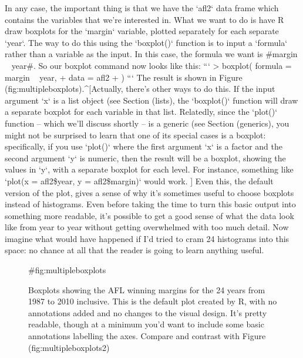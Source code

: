 In any case, the important thing is that we have the `afl2` data frame which contains the variables that we're interested in. What we want to do is have R draw boxplots for the `margin` variable, plotted separately for each separate `year`. The way to do this using the `boxplot()` function is to input a `formula` rather than a variable as the input. In this case, the formula we want is \rtextverb#margin ~ year#. So our boxplot command now looks like this:
```
> boxplot( formula = margin ~ year,
+          data = afl2
+ )
```
The result is shown in Figure \@ref(fig:multipleboxplots).^[Actually, there's other ways to do this. If the input argument `x` is a list object (see Section \@ref(lists), the `boxplot()` function will draw a separate boxplot for each variable in that list. Relatedly, since the `plot()` function -- which we'll discuss shortly -- is a generic (see Section \@ref(generics), you might not be surprised to learn that one of its special cases is a boxplot: specifically, if you use `plot()` where the first argument `x` is a factor and the second argument `y` is numeric, then the result will be a boxplot, showing the values in `y`, with a separate boxplot for each level. For instance, something like `plot(x = afl2\$year, y = afl2\$margin)` would work. ] Even this, the default version of the plot, gives a sense of why it's sometimes useful to choose boxplots instead of histograms. Even before taking the time to turn this basic output into something more readable, it's possible to get a good sense of what the data look like from year to year without getting overwhelmed with too much detail. Now imagine what would have happened if I'd tried to cram 24 histograms into this space: no chance at all that the reader is going to learn anything useful.

\begin{figure}[t]
\begin{center}
\caption{Boxplots showing the AFL winning margins for the 24 years from 1987 to 2010 inclusive. This is the default plot created by R, with no annotations added and no changes to the visual design. It's pretty readable, though at a minimum you'd want to include some basic annotations labelling the axes. Compare and contrast with Figure \@ref(fig:multipleboxplots2)}
\HR
{#fig:multipleboxplots}
\end{center}
\end{figure}

